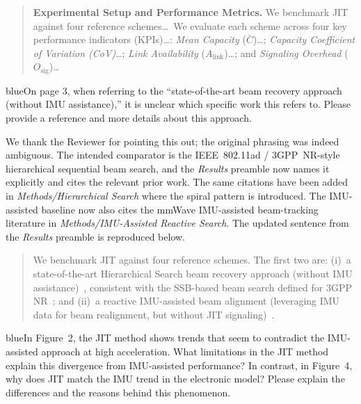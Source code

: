 \documentclass{article}
\newcommand{\blue}[1]{\begin{color}{blue}#1\end{color}}
\begin{document}
\begin{quote}
{\color{cyan!75!black}
\textbf{Experimental Setup and Performance Metrics.} We benchmark JIT against four reference schemes\ldots\ We evaluate each scheme across four key performance indicators (KPIs)\ldots: \emph{Mean Capacity} ($\bar{C}$)\ldots; \emph{Capacity Coefficient of Variation (CoV)}\ldots; \emph{Link Availability} ($A_{\text{link}}$)\ldots; and \emph{Signaling Overhead} ($O_{\text{sig}}$)\ldots
}
\end{quote}

\begin{tcbremark}
{\selectfont
\blue{On page 3, when referring to the ``state-of-the-art beam recovery approach (without IMU assistance),'' it is unclear which specific work this refers to. Please provide a reference and more details about this approach.}
}
\end{tcbremark}

\noindent We thank the Reviewer for pointing this out; the original phrasing was indeed ambiguous. The intended comparator is the IEEE~802.11ad / 3GPP~NR-style hierarchical sequential beam search, and the \emph{Results} preamble now names it explicitly and cites the relevant prior work. The same citations have been added in \emph{Methods/Hierarchical Search} where the spiral pattern is introduced. The IMU-assisted baseline now also cites the mmWave IMU-assisted beam-tracking literature in \emph{Methods/IMU-Assisted Reactive Search}. The updated sentence from the \emph{Results} preamble is reproduced below.

\begin{quote}
{\color{cyan!75!black}
We benchmark JIT against four reference schemes. The first two are: (i)~a state-of-the-art Hierarchical Search beam recovery approach (without IMU assistance)~\cite{photonics11060540}, consistent with the SSB-based beam search defined for 3GPP NR~\cite{Giordani2018ATO, Heng2021SixChallenges}; and (ii)~a reactive IMU-assisted beam alignment (leveraging IMU data for beam realignment, but without JIT signaling)~\cite{s141019622, Brambilla_2019, 9391649}.
}
\end{quote}

\begin{tcbremark}
{\selectfont
\blue{In Figure~2, the JIT method shows trends that seem to contradict the IMU-assisted approach at high acceleration. What limitations in the JIT method explain this divergence from IMU-assisted performance? In contrast, in Figure~4, why does JIT match the IMU trend in the electronic model? Please explain the differences and the reasons behind this phenomenon.}
}
\end{tcbremark}
\end{document}

